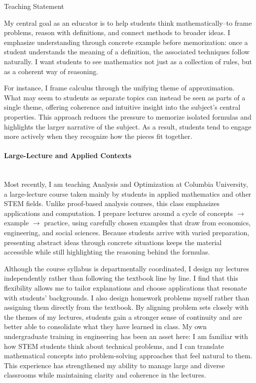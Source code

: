 \documentclass[11pt]{article}
\begin{document}
\begin{center}
\Large{Teaching Statement}
\end{center}

My central goal as an educator is to help students think mathematically--to frame problems, reason with definitions, and connect methods to broader ideas.
I emphasize understanding through concrete example before memorization: once a student understands the meaning of a definition, the associated techniques follow naturally.
I want students to see mathematics not just as a collection of rules, but as a coherent way of reasoning.

For instance, I frame calculus through the unifying theme of approximation. 
What may seem to students as separate topics can instead be seen as parts of a single theme, offering coherence and intuitive insight into the subject’s central properties.
This approach reduces the pressure to memorize isolated formulas and highlights the larger narrative of the subject. 
As a result, students tend to engage more actively when they recognize how the pieces fit together.

\paragraph{Large-Lecture and Applied Contexts}\quad \\
Most recently, I am teaching Analysis and Optimization at Columbia University, a large-lecture course taken mainly by students in applied mathematics and other STEM fields.
Unlike proof-based analysis courses, this class emphasizes applications and computation.
I prepare lectures around a cycle of concepts $\to$ example $\to$ practice, using carefully chosen examples that draw from economics, engineering, and social sciences.
Because students arrive with varied preparation, presenting abstract ideas through concrete situations keeps the material accessible while still highlighting the reasoning behind the formulas.

Although the course syllabus is departmentally coordinated, I design my lectures independently rather than following the textbook line by line.
I find that this flexibility allows me to tailor explanations and choose applications that resonate with students' backgrounds.
I also design homework problems myself rather than assigning them directly from the textbook.
By aligning problem sets closely with the themes of my lectures, students gain a stronger sense of continuity and are better able to consolidate what they have learned in class.
My own undergraduate training in engineering has been an asset here: I am familiar with how STEM students think about technical problems, and I can translate mathematical concepts into problem-solving approaches that feel natural to them.
This experience has strengthened my ability to manage large and diverse classrooms while maintaining clarity and coherence in the lectures.
\end{document}
